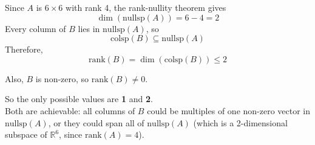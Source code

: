 \documentclass[11pt]{article}
\begin{document}
\begin{prob}[(11 pts)]
\begin{subprob}

\begin{solution}
Since $A$ is $6 \times 6$ with rank 4, the rank-nullity theorem gives
\[
\dim(\text{nullsp}(A)) = 6 - 4 = 2
\]
Every column of $B$ lies in $\text{nullsp}(A)$, so
\[
\text{colsp}(B) \subseteq \text{nullsp}(A)
\]
Therefore,
\[
\text{rank}(B) = \dim(\text{colsp}(B)) \leq 2
\]

Also, $B$ is non-zero, so $\text{rank}(B) \neq 0$.

So the only possible values are \textbf{1} and \textbf{2}. \\

Both are achievable: all columns of $B$ could be multiples of one non-zero vector in $\text{nullsp}(A)$, or they could span all of $\text{nullsp}(A)$ (which is a 2-dimensional subspace of $\mathbb{R}^6$, since $\text{rank}(A)=4$).
\end{solution}
\end{subprob}
\end{prob}

\newpage
\end{document}
